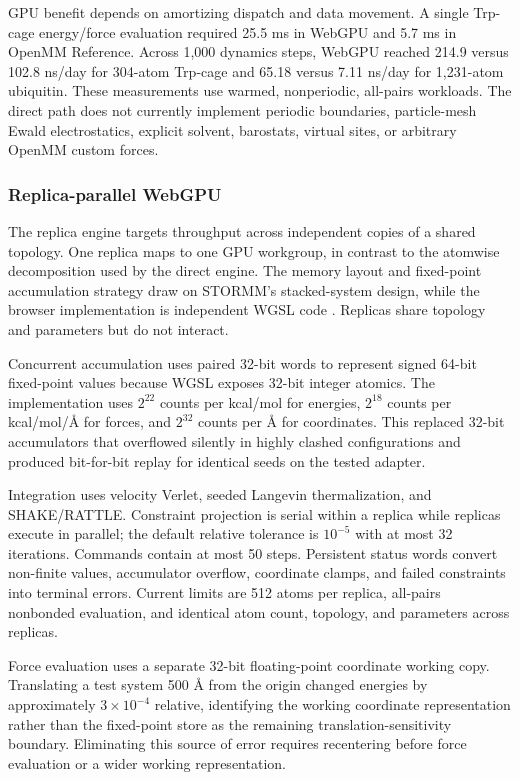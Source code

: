 \documentclass[11pt]{article}
\begin{document}
\begin{small}
GPU benefit depends on amortizing dispatch and data movement. A single Trp-cage energy/force evaluation required 25.5 ms in WebGPU and 5.7 ms in OpenMM Reference. Across 1,000 dynamics steps, WebGPU reached 214.9 versus 102.8 ns/day for 304-atom Trp-cage and 65.18 versus 7.11 ns/day for 1,231-atom ubiquitin. These measurements use warmed, nonperiodic, all-pairs workloads. The direct path does not currently implement periodic boundaries, particle-mesh Ewald electrostatics, explicit solvent, barostats, virtual sites, or arbitrary OpenMM custom forces.

\subsubsection{Replica-parallel WebGPU}

The replica engine targets throughput across independent copies of a shared topology. One replica maps to one GPU workgroup, in contrast to the atomwise decomposition used by the direct engine. The memory layout and fixed-point accumulation strategy draw on STORMM's stacked-system design, while the browser implementation is independent WGSL code \citep{cerutti2024stormm}. Replicas share topology and parameters but do not interact.

Concurrent accumulation uses paired 32-bit words to represent signed 64-bit fixed-point values because WGSL exposes 32-bit integer atomics. The implementation uses $2^{22}$ counts per kcal/mol for energies, $2^{18}$ counts per kcal/mol/\AA{} for forces, and $2^{32}$ counts per \AA{} for coordinates. This replaced 32-bit accumulators that overflowed silently in highly clashed configurations and produced bit-for-bit replay for identical seeds on the tested adapter.

Integration uses velocity Verlet, seeded Langevin thermalization, and SHAKE/RATTLE. Constraint projection is serial within a replica while replicas execute in parallel; the default relative tolerance is $10^{-5}$ with at most 32 iterations. Commands contain at most 50 steps. Persistent status words convert non-finite values, accumulator overflow, coordinate clamps, and failed constraints into terminal errors. Current limits are 512 atoms per replica, all-pairs nonbonded evaluation, and identical atom count, topology, and parameters across replicas.

Force evaluation uses a separate 32-bit floating-point coordinate working copy. Translating a test system 500 \AA{} from the origin changed energies by approximately $3 \times 10^{-4}$ relative, identifying the working coordinate representation rather than the fixed-point store as the remaining translation-sensitivity boundary. Eliminating this source of error requires recentering before force evaluation or a wider working representation.


\end{small}
\end{document}
